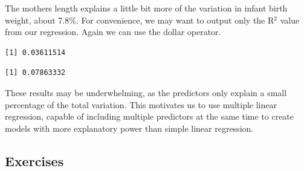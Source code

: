 \documentclass[
  letterpaper,
  DIV=11,
  numbers=noendperiod]{scrreprt}
\newenvironment{Shaded}{\begin{snugshade}}{\end{snugshade}}
\newcommand{\AttributeTok}[1]{\textcolor[rgb]{0.40,0.45,0.13}{#1}}
\newcommand{\CommentTok}[1]{\textcolor[rgb]{0.37,0.37,0.37}{#1}}
\newcommand{\FunctionTok}[1]{\textcolor[rgb]{0.28,0.35,0.67}{#1}}
\newcommand{\NormalTok}[1]{\textcolor[rgb]{0.00,0.23,0.31}{#1}}
\newcommand{\OtherTok}[1]{\textcolor[rgb]{0.00,0.23,0.31}{#1}}
\newcommand{\SpecialCharTok}[1]{\textcolor[rgb]{0.37,0.37,0.37}{#1}}
\begin{document}
The mothers length explains a little bit more of the variation in infant
birth weight, about 7.8\%. For convenience, we may want to output only
the R\(^2\) value from our regression. Again we can use the dollar
operator.

\begin{Shaded}
\end{Shaded}

\begin{verbatim}
[1] 0.03611514
\end{verbatim}

\begin{Shaded}
\end{Shaded}

\begin{verbatim}
[1] 0.07863332
\end{verbatim}

These results may be underwhelming, as the predictors only explain a
small percentage of the total variation. This motivates us to use
multiple linear regression, capable of including multiple predictors at
the same time to create models with more explanatory power than simple
linear regression.

\subsection{Exercises}\label{exercises-17}
\end{document}
